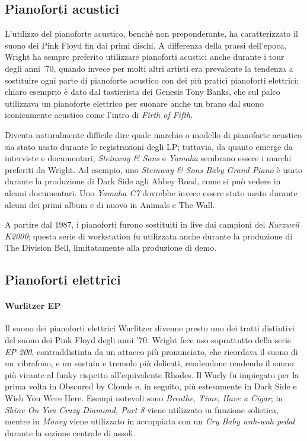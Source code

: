 \documentclass[class=book, crop=false, oneside, 12pt]{standalone}
\begin{document}
    \subsection{Pianoforti acustici}
    L'utilizzo del pianoforte acustico, benché non preponderante, ha caratterizzato il suono dei Pink Floyd fin dai primi dischi. A differenza della prassi dell'epoca, Wright ha sempre preferito utilizzare pianoforti acustici anche durante i tour degli anni '70, quando invece per molti altri artisti era prevalente la tendenza a sostituire ogni parte di pianoforte acustico con dei più pratici pianoforti elettrici; chiaro esemprio è dato dal tastierista dei Genesis Tony Banks, che sul palco utilizzava un pianoforte elettrico per suonare anche un brano dal suono iconicamente acustico come l'intro di \emph{Firth of Fifth}. 
    
    Diventa naturalmente difficile dire quale marchio o modello di pianoforte acustico sia stato usato durante le registrazioni degli LP; tuttavia, da quanto emerge da interviste e documentari, \emph{Steinway \& Sons} e \emph{Yamaha} sembrano essere i marchi preferiti da Wright. Ad esempio, uno \emph{Steinway \& Sons Baby Grand Piano} è usato durante la produzione di Dark Side agli Abbey Road, come si può vedere in alcuni documentari. Uno \emph{Yamaha C7} dovrebbe invece essere stato usato durante alcuni dei primi album e di nuovo in Animals e The Wall.

    A partire dal 1987, i pianoforti furono sostituiti in live dai campioni del \emph{Kurzweil K2000}; questa serie di workstation fu utilizzata anche durante la produzione di The Division Bell, limitatamente alla produzione di demo.

    \subsection{Pianoforti elettrici}

    \paragraph{Wurlitzer EP}
    Il suono dei pianoforti elettrici Wurlitzer divenne presto uno dei tratti distintivi del suono dei Pink Floyd degli anni '70. Wright fece uso soprattutto della serie \emph{EP-200}, contraddistinta da un attacco più pronunciato, che ricordava il suono di un vibrafono, e un sustain e tremolo più delicati, rendendone rendendo il suono più virante al funky rispetto all'equivalente Rhodes. Il Wurly fu impiegato per la prima volta in Obscured by Clouds e, in seguito, più estesamente in Dark Side e Wish You Were Here. Esempi notevoli sono \emph{Breathe}, \emph{Time}, \emph{Have a Cigar}; in \emph{Shine On You Crazy Diamond, Part 8} viene utilizzato in funzione solistica, mentre in \emph{Money} viene utilizzato in accoppiata con un \emph{Cry Baby wah-wah pedal} durante la sezione centrale di assoli. 
\end{document}
